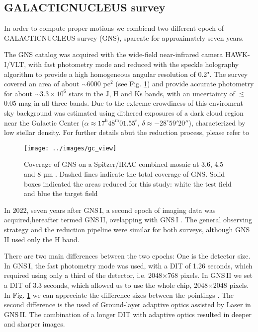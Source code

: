 \documentclass{aa} %
\begin{document}
	\subsection{GALACTICNUCLEUS survey}
	
	In order to compute proper motions we combiend two different epoch of GALACTICNUCLEUS survey (GNS), spareate for approximately seven years. 
	
	The GNS catalog \citep[][hereafter GNS\,I]{GNSII} was acquired with the wide-field near-infrared camera HAWK-I/VLT, with fast photometry mode and reduced with the speckle holography algorithm \citep[][]{Holography} to provide a high homogeneous angular resolution of 0.2". The survey covered an area of about $\sim$6000 pc$^{2}$ (see Fig. \ref{fig:gcview}) and provide accurate photometry for about $\sim 3.3 \times 10^{6}$ stars in the J, H and Ks bands, with an uncertainty of $\lesssim$ 0.05 mag in all three bands. Due to the extreme crowdiness of this enviroment sky background was estimated using dithered exposures of a dark cloud region near the Galactic Center ($\alpha \approx 17^\mathrm{h}48^\mathrm{m}01.55^\mathrm{s}$, $\delta \approx -28^\circ59'20''$), characterized by low stellar density. For further details  abut the reduction process, please refer to \cite{GNSI, GNSII}
	
	\begin{figure}
		\centering
		\texttt{[image: ../images/gc\_view]}
		\caption{Coverage of GNS on a Spitzer/IRAC combined mosaic at 3.6, 4.5 and 8 µm \citep{Spitzer_image}. Dashed lines indicate the total coverage of GNS. Solid boxes indicated the areas reduced for this study: white the test field and blue the target field }
		\label{fig:gcview}
	\end{figure}
	
	In 2022, seven years after  GNS\,I, a second epoch of imaging data was acquired,hereafter termed GNS\,II, ovelapping with GNS\,I . The general observing strategy and the reduction pipeline were similar for both surveys, although GNS\,II used only the H band.
	
	There are two main differences between the two epochs: One is the detector size. In  GNS\,I, the fast photometry mode was used, with a DIT of 1.26 seconds, which required using only a third of the detector, i.e. 2048$\times$768 pixels. In  GNS\,II we set a DIT of 3.3 seconds, which  allowed us to use the whole chip, 2048$\times$2048 pixels. In Fig. \ref{fig:gcview} we can appreciate the difference sizes  between the pointings . The second difference is the used of Ground-layer adaptive optics assisted by Laser \citep[GRAAL,][]{GRAAL} in  GNS\,II. The combination of a longer DIT with adaptive optics resulted in deeper and sharper images.
	
\end{document}

